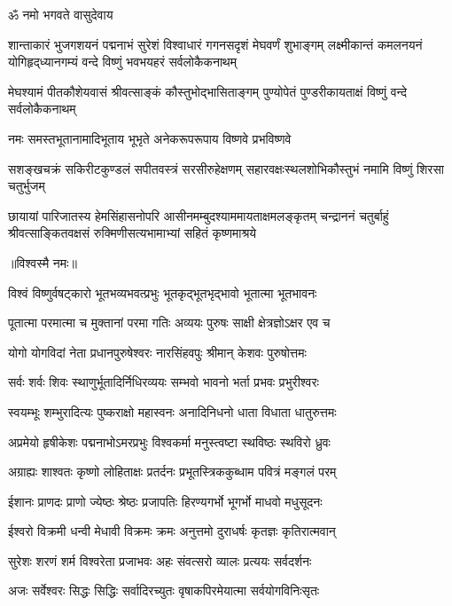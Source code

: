 \centerline{ॐ नमो भगवते वासुदेवाय}
\fourlineindentedshloka
{शान्ताकारं भुजगशयनं पद्मनाभं सुरेशं}
{विश्वाधारं गगनसदृशं मेघवर्णं शुभाङ्गम्}
{लक्ष्मीकान्तं कमलनयनं योगिहृद्‌ध्यानगम्यं}
{वन्दे विष्णुं भवभयहरं सर्वलोकैकनाथम्}

\fourlineindentedshloka
{मेघश्यामं पीतकौशेयवासं}
{श्रीवत्साङ्कं कौस्तुभोद्भासिताङ्गम्}
{पुण्योपेतं पुण्डरीकायताक्षं}
{विष्णुं वन्दे सर्वलोकैकनाथम्}

\twolineshloka
{नमः समस्तभूतानामादिभूताय भूभृते}
{अनेकरूपरूपाय विष्णवे प्रभविष्णवे}

\fourlineindentedshloka
{सशङ्खचक्रं सकिरीटकुण्डलं}
{सपीतवस्त्रं सरसीरुहेक्षणम्}
{सहारवक्षःस्थलशोभिकौस्तुभं}
{नमामि विष्णुं शिरसा चतुर्भुजम्}

\fourlineindentedshloka
{छायायां पारिजातस्य हेमसिंहासनोपरि}
{आसीनमम्बुदश्याममायताक्षमलङ्कृतम्}
{चन्द्राननं चतुर्बाहुं श्रीवत्साङ्कितवक्षसं}
{रुक्मिणीसत्यभामाभ्यां सहितं कृष्णमाश्रये}

\centerline{॥विश्वस्मै नमः॥}\nopagebreak[4]
\resetShloka
\twolineshloka
{विश्वं विष्णुर्वषट्कारो भूतभव्यभवत्प्रभुः}
{भूतकृद्भूतभृद्भावो भूतात्मा भूतभावनः}

\twolineshloka
{पूतात्मा परमात्मा च मुक्तानां परमा गतिः}
{अव्ययः पुरुषः साक्षी क्षेत्रज्ञोऽक्षर एव च}

\twolineshloka
{योगो योगविदां नेता प्रधानपुरुषेश्वरः}
{नारसिंहवपुः श्रीमान् केशवः पुरुषोत्तमः}

\twolineshloka
{सर्वः शर्वः शिवः स्थाणुर्भूतादिर्निधिरव्ययः}
{सम्भवो भावनो भर्ता प्रभवः प्रभुरीश्वरः}

\twolineshloka
{स्वयम्भूः शम्भुरादित्यः पुष्कराक्षो महास्वनः}
{अनादिनिधनो धाता विधाता धातुरुत्तमः}

\twolineshloka
{अप्रमेयो हृषीकेशः पद्मनाभोऽमरप्रभुः}
{विश्वकर्मा मनुस्त्वष्टा स्थविष्ठः स्थविरो ध्रुवः}

\twolineshloka
{अग्राह्यः शाश्वतः कृष्णो लोहिताक्षः प्रतर्दनः}
{प्रभूतस्त्रिककुब्धाम पवित्रं मङ्गलं परम्}

\twolineshloka
{ईशानः प्राणदः प्राणो ज्येष्ठः श्रेष्ठः प्रजापतिः}
{हिरण्यगर्भो भूगर्भो माधवो मधुसूदनः}

\twolineshloka
{ईश्वरो विक्रमी धन्वी मेधावी विक्रमः क्रमः}
{अनुत्तमो दुराधर्षः कृतज्ञः कृतिरात्मवान्}

\twolineshloka
{सुरेशः शरणं शर्म विश्वरेता प्रजाभवः}
{अहः संवत्सरो व्यालः प्रत्ययः सर्वदर्शनः}

\twolineshloka
{अजः सर्वेश्वरः सिद्धः सिद्धिः सर्वादिरच्युतः}
{वृषाकपिरमेयात्मा सर्वयोगविनिःसृतः}

